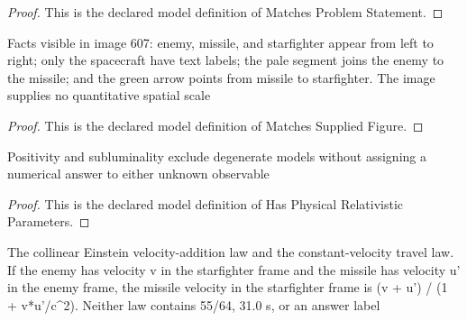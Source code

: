 \begin{proof}
  This is the declared model definition of Matches Problem Statement.
\end{proof}
\begin{definition}
  \label{def:physics:phyx-mini-0607:phyxminiproblems-problemphyxmini0607-matchessuppliedfigure}
  Facts visible in image 607: enemy, missile, and starfighter appear from left to right; only the spacecraft have text labels; the pale segment joins the enemy to the missile; and the green arrow points from missile to starfighter. The image supplies no quantitative spatial scale
\end{definition}
\begin{proof}
  This is the declared model definition of Matches Supplied Figure.
\end{proof}
\begin{definition}
  \label{def:physics:phyx-mini-0607:phyxminiproblems-problemphyxmini0607-hasphysicalrelativisticparameters}
  Positivity and subluminality exclude degenerate models without assigning a numerical answer to either unknown observable
\end{definition}
\begin{proof}
  This is the declared model definition of Has Physical Relativistic Parameters.
\end{proof}
\begin{definition}
  \label{def:physics:phyx-mini-0607:phyxminiproblems-problemphyxmini0607-satisfiescollinearrelativisticinterceptlaws}
  The collinear Einstein velocity-addition law and the constant-velocity travel law. If the enemy has velocity v in the starfighter frame and the missile has velocity u' in the enemy frame, the missile velocity in the starfighter frame is (v + u') / (1 + v*u'/c\textasciicircum{}2). Neither law contains 55/64, 31.0 s, or an answer label
\end{definition}

